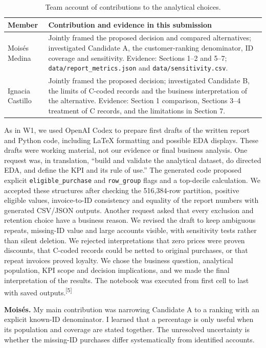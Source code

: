 \documentclass[10pt,a4paper]{article}
\newcommand{\subhead}[1]{\vspace{0.15em}{\bfseries #1}\par}
\newcommand{\source}[1]{\textsuperscript{[#1]}}
\begin{document}
\subhead{Individual contributions}
\begin{table}[H]\centering\small
\caption{Team account of contributions to the analytical choices.}
\begin{tabularx}{\linewidth}{@{}p{2.4cm}X@{}}\toprule
Member & Contribution and evidence in this submission \\\midrule
Mois\'{e}s Medina & Jointly framed the proposed decision and compared alternatives; investigated Candidate A, the customer-ranking denominator, ID coverage and sensitivity. Evidence: Sections 1--2 and 5--7; \texttt{data/report\_metrics.json} and \texttt{data/sensitivity.csv}. \\
Ignacia Castillo & Jointly framed the proposed decision; investigated Candidate B, the limits of C-coded records and the business interpretation of the alternative. Evidence: Section 1 comparison, Sections 3--4 treatment of C records, and the limitations in Section 7. \\
\bottomrule\end{tabularx}
\end{table}

\subhead{AI use and verification}
As in W1, we used OpenAI Codex to prepare first drafts of the written report and Python code, including LaTeX formatting and possible EDA displays. These drafts were working material, not our evidence or final business analysis. One request was, in translation, ``build and validate the analytical dataset, do directed EDA, and define the KPI and its rule of use.'' The generated code proposed explicit \texttt{eligible\_purchase} and \texttt{row\_group} flags and a top-decile calculation. We accepted these structures after checking the 516,384-row partition, positive eligible values, invoice-to-ID consistency and equality of the report numbers with generated CSV/JSON outputs. Another request asked that every exclusion and retention choice have a business reason. We revised the draft to keep ambiguous repeats, missing-ID value and large accounts visible, with sensitivity tests rather than silent deletion. We rejected interpretations that zero prices were proven discounts, that C-coded records could be netted to original purchases, or that repeat invoices proved loyalty. We chose the business question, analytical population, KPI scope and decision implications, and we made the final interpretation of the results. The notebook was executed from first cell to last with saved outputs.\source{5}

\subhead{Individual reflection}
\textbf{Mois\'{e}s.} My main contribution was narrowing Candidate A to a ranking with an explicit known-ID denominator. I learned that a percentage is only useful when its population and coverage are stated together. The unresolved uncertainty is whether the missing-ID purchases differ systematically from identified accounts.
\end{document}
